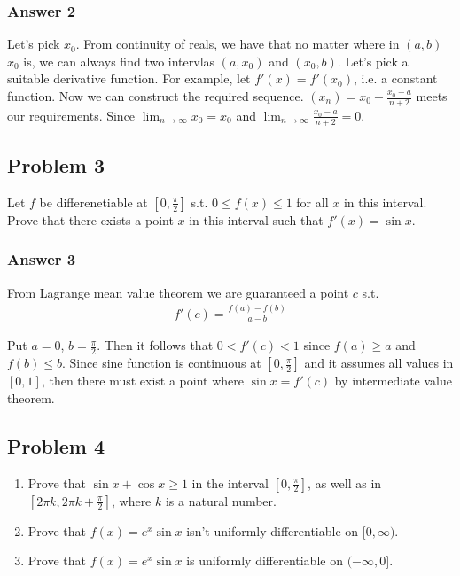 \documentclass[a4paper]{article}
\begin{document}
\subsubsection{Answer 2}
\label{sec:orgheadline3}
Let's pick \(x_0\).  From continuity of reals, we have that no matter where in
\((a, b)\) \(x_0\) is, we can always find two intervlas \((a, x_0)\) and \((x_0,
    b)\).  Let's pick a suitable derivative function.  For example, let \(f'(x) =
    f'(x_0)\), i.e. a constant function.  Now we can construct the required
sequence.  \((x_n) = x_0 - \frac{x_0 - a}{n + 2}\) meets our requirements.
Since \(\lim_{n \to \infty}x_0 = x_0\) and \(\lim_{n \to \infty}\frac{x_0 -
    a}{n + 2} = 0\).

\subsection{Problem 3}
\label{sec:orgheadline6}
Let \(f\) be differenetiable at \([0, \frac{\pi}{2}]\) s.t. \(0 \leq f(x) \leq 1\) for
all \(x\) in this interval.  Prove that there exists a point \(x\) in this interval
such that \(f'(x) = \sin x\).

\subsubsection{Answer 3}
\label{sec:orgheadline5}
From Lagrange mean value theorem we are guaranteed a point \(c\) s.t.
\begin{align*}
  f'(c) = \frac{f(a) - f(b)}{a - b}
\end{align*}

Put \(a = 0\), \(b = \frac{\pi}{2}\).  Then it follows that \(0 < f'(c) < 1\)
since \(f(a) \geq a\) and \(f(b) \leq b\).  Since sine function is continuous at
\([0, \frac{\pi}{2}]\) and it assumes all values in \([0, 1]\), then there must
exist a point where \(\sin x = f'(c)\) by intermediate value theorem.

\subsection{Problem 4}
\label{sec:orgheadline10}
\begin{enumerate}
\item Prove that \(\sin x + \cos x \geq 1\) in the interval \([0, \frac{\pi}{2}]\),
as well as in \([2\pi k, 2\pi k + \frac{\pi}{2}]\), where \(k\) is a natural
number.
\item Prove that \(f(x) = e^x \sin x\) isn't uniformly differentiable on \([0, \infty)\).
\item Prove that \(f(x) = e^x \sin x\) is uniformly differentiable on \((-\infty, 0]\).
\end{enumerate}
\end{document}
